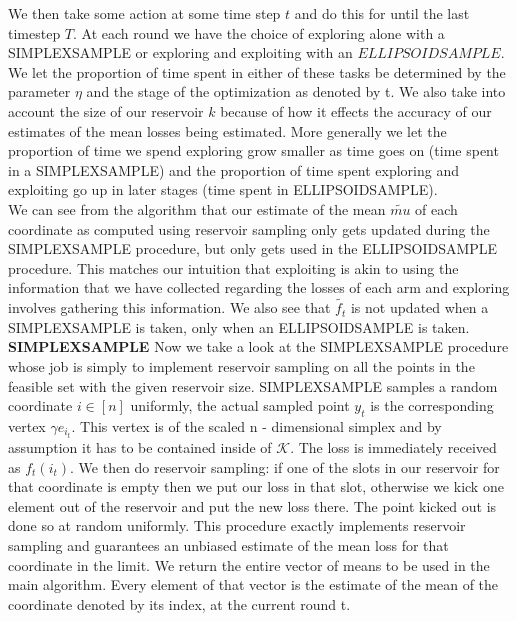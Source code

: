 We then take some action at some time step $t$ and do this for until the last timestep $T$. At each round we have the choice of exploring alone with a SIMPLEXSAMPLE or exploring and exploiting with an $ELLIPSOIDSAMPLE$. We let the proportion of time spent in either of these tasks  be determined by the parameter $\eta$ and the stage of the optimization as denoted by t. We also take into account the size of our reservoir $k$ because of how it effects the accuracy of our estimates of the mean losses being estimated. More generally we let the proportion of time we spend exploring grow smaller as time goes on (time spent in a SIMPLEXSAMPLE) and the proportion of time spent exploring and exploiting go up in 
later stages (time spent in ELLIPSOIDSAMPLE).\\


We can see from the algorithm that our estimate of the mean $\tilde{mu}$ of each coordinate as computed using reservoir sampling only gets updated during the SIMPLEXSAMPLE procedure, but only gets used in the ELLIPSOIDSAMPLE procedure. This matches our intuition that exploiting is akin to using the information that we have collected regarding the losses of each arm and exploring involves gathering this information. We also see that $\tilde{f_t}$ is not updated when a SIMPLEXSAMPLE is taken, only when an ELLIPSOIDSAMPLE is taken. \\


\textbf{SIMPLEXSAMPLE}
Now we take a look at the SIMPLEXSAMPLE procedure whose job is simply to implement reservoir sampling on all the points in the feasible set with the given reservoir size. SIMPLEXSAMPLE samples a random coordinate $i \in [n]$ uniformly, the actual sampled point  $y_t$ is the corresponding vertex $\gamma e_{i_t}$. This vertex is of the scaled n - dimensional simplex and by assumption it has to be contained inside of $\mathcal{K}$. The loss is immediately received as $f_t(i_t)$. We then do reservoir sampling: if one of the slots in our reservoir for that coordinate is empty then we put our loss in that slot, otherwise we kick one element out of the reservoir and put the new loss there. The point kicked out is done so at random uniformly. This procedure exactly implements reservoir sampling and guarantees an unbiased estimate of the mean loss for that coordinate in the limit. We return the entire vector of means to be used in the main algorithm. Every element of that vector is the estimate of the mean of the coordinate denoted by its index, at the current round t.
 
